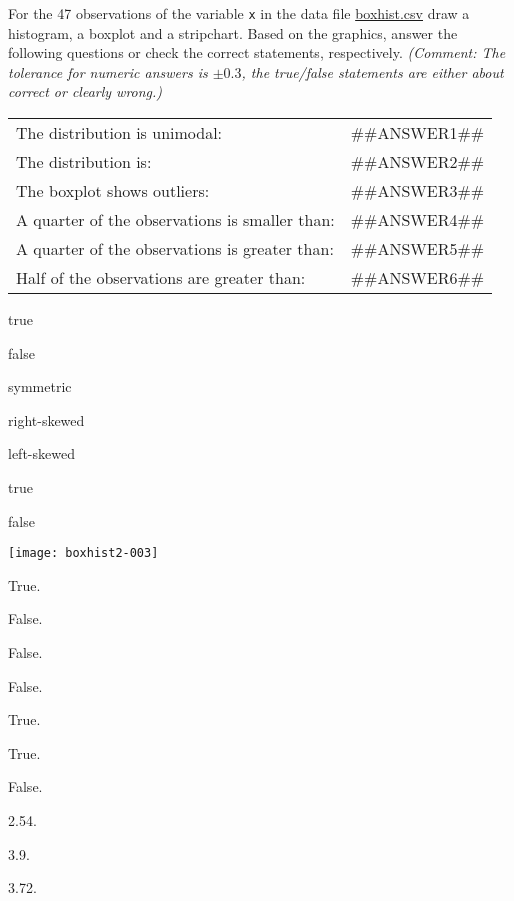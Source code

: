 
\begin{question}
For the 47 observations of the variable \texttt{x} in the data file
\url{boxhist.csv} draw a histogram, a boxplot and a stripchart.
Based on the graphics, answer the following questions or check the correct
statements, respectively. \emph{(Comment: The tolerance for numeric answers is
$\pm0.3$, the true/false statements are either about correct or clearly wrong.)}

\begin{tabular}{lr}
The distribution is unimodal:                         & ##ANSWER1## \\
The distribution is:                                  & ##ANSWER2## \\
The boxplot shows outliers:                           & ##ANSWER3## \\
A quarter of the observations is smaller than:        & ##ANSWER4## \\
A quarter of the observations is greater than:        & ##ANSWER5## \\
Half of the observations are greater than: & ##ANSWER6##
\end{tabular}

\begin{answerlist}
  \item true
  \item false
  \item symmetric
  \item right-skewed
  \item left-skewed
  \item true
  \item false
  \item 
  \item 
  \item 
\end{answerlist}
\end{question}

\begin{solution}
\texttt{[image: boxhist2-003]}

\begin{answerlist}
  \item True.
  \item False.
  \item False.
  \item False.
  \item True.
  \item True.
  \item False.
  \item 2.54.
  \item 3.9.
  \item 3.72.
\end{answerlist}
\end{solution}

